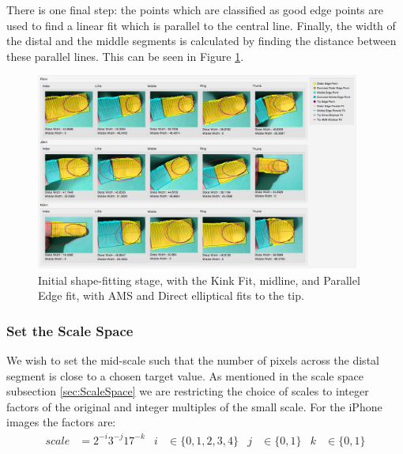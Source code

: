 There is one final step: the points which are classified as good edge points are used to find a linear fit which is parallel to the central line. Finally, the width of the distal and the middle segments is calculated by finding the distance between these parallel lines. This can be seen in Figure \ref{fig:ParallelFit}.

\begin{figure}[h!]
  \centering
    \includegraphics[width=0.95\textwidth]{Chapter4/Figs/ParallelFit.jpg}
    \caption{Initial shape-fitting stage, with the Kink Fit, midline, and Parallel Edge fit, with AMS and Direct elliptical fits to the tip.}\label{fig:ParallelFit}
\end{figure}

\subsubsection{Set the Scale Space}\label{sec:SetTheScaleSpace}
We wish to set the mid-scale such that the number of pixels across the distal segment is close to a chosen target value. As mentioned in the scale space subsection \ref{sec:ScaleSpace} we are restricting the choice of scales to integer factors of the original and integer multiples of the small scale. For the iPhone images the factors are:
\begin{align}
scale &= 2^{-i} 3^{-j} 17^{-k}  & i &\in \{0,1,2,3,4\} 
&  j &\in \{0, 1\} 
& k &\in \{0, 1\}
\end{align}

